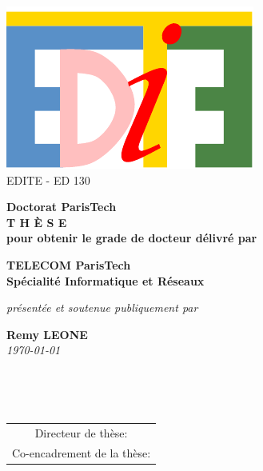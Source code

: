 \vspace{0.cm}
\begin{center}

\includegraphics[scale=0.65]{img/logos/edite.pdf} \\
{\small {EDITE - ED 130}}


\vspace{.5cm}


\vspace{1.0cm}

{\LARGE \textbf{Doctorat ParisTech}}\\
\vspace{1.1cm}
{\LARGE \textbf{T H È S E}}\\
\vspace{0.5cm}
{\normalsize \textbf{pour obtenir le grade de docteur délivré par}}\\

\vspace{.9cm}

{\LARGE \textbf{TELECOM ParisTech}}\\
\vspace{0.6cm}
{\Large \textbf{Spécialité Informatique et Réseaux}}\\

\vspace{.8cm}

{\normalsize \textit{présentée et soutenue publiquement par}}\\
\vspace{0.7cm}

{\Large \textbf{Remy LEONE}}\\
\vspace{0.24cm}
{\normalsize \textit{\today}}\\

\vfill

\textcolor[RGB]{191,18,56}{
\noindent
{\LARGE \textbf{\myTitle}}\\
}

\vfill~\vfill

{\normalsize
\begin{tabular}{c}
Directeur de thèse: 			\textbf{\JeanLouis}\\
Co-encadrement de la thèse:		\textbf{\Vania}
\end{tabular}
}
\end{center}

